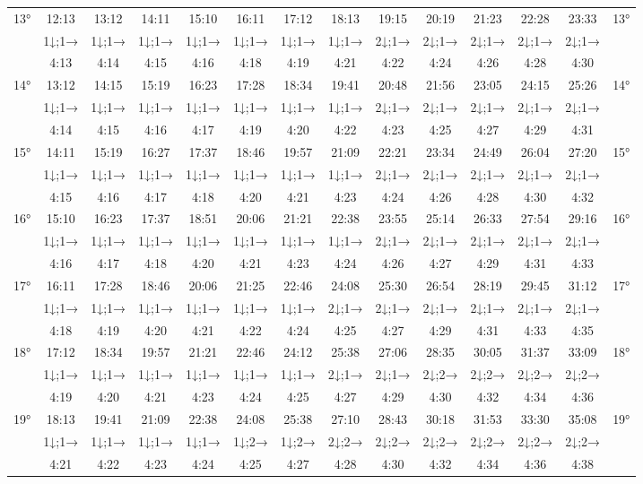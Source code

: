 \begin{scriptsize}
\begin{tabular}{c || c | c | c | c | c | c | c | c | c | c | c | c || c}
		\multirow{3}{*}{13°}&12:13&13:12&14:11&15:10&16:11&17:12&18:13&19:15&20:19&21:23&22:28&23:33&\multirow{3}{*}{13°}\\ \space&1↓;1→&1↓;1→&1↓;1→&1↓;1→&1↓;1→&1↓;1→&1↓;1→&2↓;1→&2↓;1→&2↓;1→&2↓;1→&2↓;1→&\space\\&4:13&4:14&4:15&4:16&4:18&4:19&4:21&4:22&4:24&4:26&4:28&4:30&\space\\\hline
		\multirow{3}{*}{14°}&13:12&14:15&15:19&16:23&17:28&18:34&19:41&20:48&21:56&23:05&24:15&25:26&\multirow{3}{*}{14°}\\ \space&1↓;1→&1↓;1→&1↓;1→&1↓;1→&1↓;1→&1↓;1→&1↓;1→&2↓;1→&2↓;1→&2↓;1→&2↓;1→&2↓;1→&\space\\&4:14&4:15&4:16&4:17&4:19&4:20&4:22&4:23&4:25&4:27&4:29&4:31&\space\\\hline
		\multirow{3}{*}{15°}&14:11&15:19&16:27&17:37&18:46&19:57&21:09&22:21&23:34&24:49&26:04&27:20&\multirow{3}{*}{15°}\\ \space&1↓;1→&1↓;1→&1↓;1→&1↓;1→&1↓;1→&1↓;1→&1↓;1→&2↓;1→&2↓;1→&2↓;1→&2↓;1→&2↓;1→&\space\\&4:15&4:16&4:17&4:18&4:20&4:21&4:23&4:24&4:26&4:28&4:30&4:32&\space\\\hline
		\multirow{3}{*}{16°}&15:10&16:23&17:37&18:51&20:06&21:21&22:38&23:55&25:14&26:33&27:54&29:16&\multirow{3}{*}{16°}\\ \space&1↓;1→&1↓;1→&1↓;1→&1↓;1→&1↓;1→&1↓;1→&1↓;1→&2↓;1→&2↓;1→&2↓;1→&2↓;1→&2↓;1→&\space\\&4:16&4:17&4:18&4:20&4:21&4:23&4:24&4:26&4:27&4:29&4:31&4:33&\space\\\hline
		\multirow{3}{*}{17°}&16:11&17:28&18:46&20:06&21:25&22:46&24:08&25:30&26:54&28:19&29:45&31:12&\multirow{3}{*}{17°}\\ \space&1↓;1→&1↓;1→&1↓;1→&1↓;1→&1↓;1→&1↓;1→&2↓;1→&2↓;1→&2↓;1→&2↓;1→&2↓;1→&2↓;1→&\space\\&4:18&4:19&4:20&4:21&4:22&4:24&4:25&4:27&4:29&4:31&4:33&4:35&\space\\\hline
		\multirow{3}{*}{18°}&17:12&18:34&19:57&21:21&22:46&24:12&25:38&27:06&28:35&30:05&31:37&33:09&\multirow{3}{*}{18°}\\ \space&1↓;1→&1↓;1→&1↓;1→&1↓;1→&1↓;1→&1↓;1→&2↓;1→&2↓;1→&2↓;2→&2↓;2→&2↓;2→&2↓;2→&\space\\&4:19&4:20&4:21&4:23&4:24&4:25&4:27&4:29&4:30&4:32&4:34&4:36&\space\\\hline
		\multirow{3}{*}{19°}&18:13&19:41&21:09&22:38&24:08&25:38&27:10&28:43&30:18&31:53&33:30&35:08&\multirow{3}{*}{19°}\\ \space&1↓;1→&1↓;1→&1↓;1→&1↓;1→&1↓;2→&1↓;2→&2↓;2→&2↓;2→&2↓;2→&2↓;2→&2↓;2→&2↓;2→&\space\\&4:21&4:22&4:23&4:24&4:25&4:27&4:28&4:30&4:32&4:34&4:36&4:38&\space\\\hline

\end{tabular}
\end{scriptsize}

